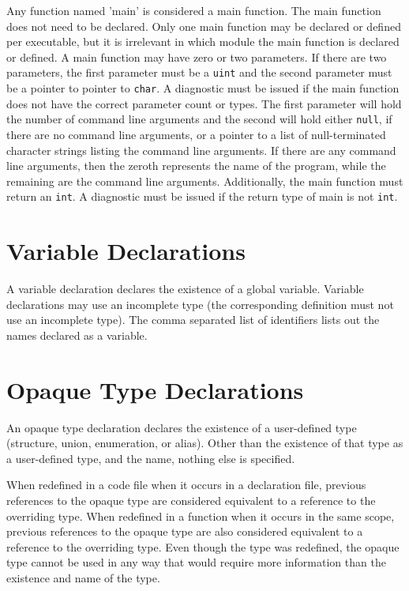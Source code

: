 \documentclass[letterpaper,12pt]{book}
\begin{document}
Any function named 'main' is considered a main function. The main function does not need to be declared. Only one main function may be declared or defined per executable, but it is irrelevant in which module the main function is declared or defined. A main function may have zero or two parameters. If there are two parameters, the first parameter must be a \texttt{uint} and the second parameter must be a pointer to pointer to \texttt{char}. A diagnostic must be issued if the main function does not have the correct parameter count or types. The first parameter will hold the number of command line arguments and the second will hold either \texttt{null}, if there are no command line arguments, or a pointer to a list of null-terminated character strings listing the command line arguments. If there are any command line arguments, then the zeroth represents the name of the program, while the remaining are the command line arguments. Additionally, the main function must return an \texttt{int}. A diagnostic must be issued if the return type of main is not \texttt{int}.

\section{Variable Declarations}



A variable declaration declares the existence of a global variable. Variable declarations may use an incomplete type (the corresponding definition must not use an incomplete type). The comma separated list of identifiers lists out the names declared as a variable.

\section{Opaque Type Declarations}\label{section:Opaque Type Declarations}



An opaque type declaration declares the existence of a user-defined type (structure, union, enumeration, or alias). Other than the existence of that type as a user-defined type, and the name, nothing else is specified.

When redefined in a code file when it occurs in a declaration file, previous references to the opaque type are considered equivalent to a reference to the overriding type. When redefined in a function when it occurs in the same scope, previous references to the opaque type are also considered equivalent to a reference to the overriding type. Even though the type was redefined, the opaque type cannot be used in any way that would require more information than the existence and name of the type.
\end{document}
